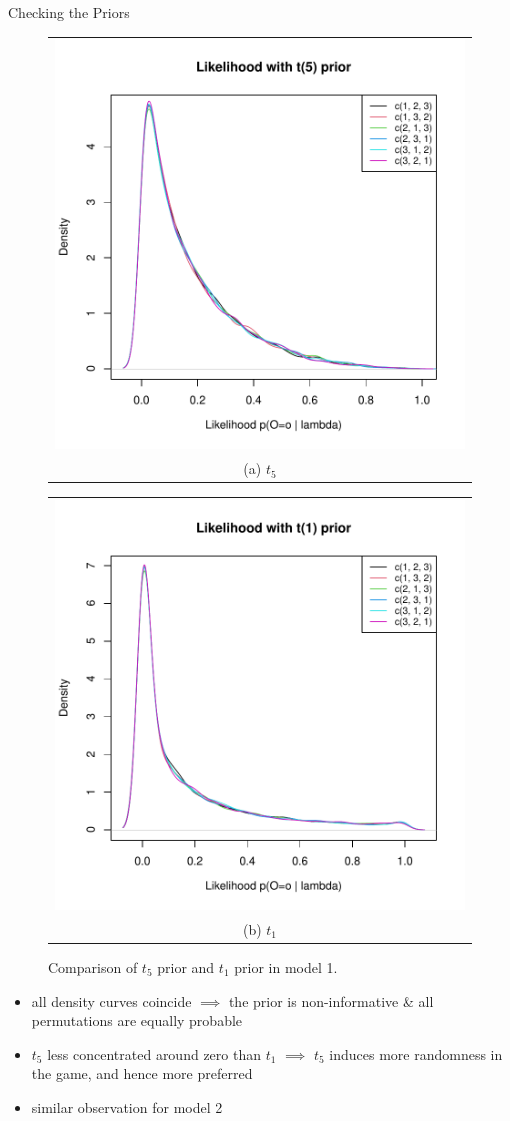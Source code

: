 \begin{frame}{Checking the Priors}

\begin{figure}
  \centering
  \begin{tabular}[b]{c}
    \includegraphics[width=.4\linewidth]{img/one_t5.pdf} \\
    \small (a) $t_5$
  \end{tabular} \qquad
  \begin{tabular}[b]{c}
    \includegraphics[width=.4\linewidth]{img/one_t1.pdf} \\
    \small (b) $t_1$
  \end{tabular}
  \caption{Comparison of $t_5$ prior and $t_1$ prior in model 1. }
\end{figure}
\vspace{-1em}
\begin{itemize}
    \item all density curves coincide $\implies$ the prior is non-informative \& all permutations are equally probable
    \item $t_5$ less concentrated around zero than $t_1$ $\implies$ $t_5$ induces more randomness in the game, and hence more preferred
    \item similar observation for model 2
\end{itemize}
\end{frame}

